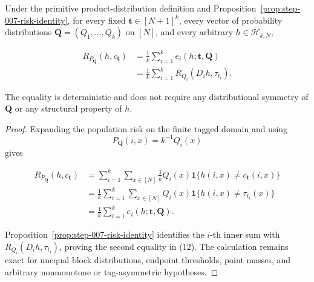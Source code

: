 \begin{proposition}\label{prop:step-008-risk-decomposition}
Under the primitive product-distribution definition and Proposition~\ref{prop:step-007-risk-identity}, for every fixed
\(\boldsymbol t\in[N+1]^k\), every vector of probability distributions
\(\boldsymbol Q=(Q_1,\ldots,Q_k)\) on \([N]\), and every arbitrary
\(h\in\mathcal H_{k,N}\),

\[
\begin{aligned}
R_{P_{\boldsymbol Q}}(h,c_{\boldsymbol t})
&=\frac1k\sum_{i=1}^k e_i(h;\boldsymbol t,\boldsymbol Q)\\
&=\frac1k\sum_{i=1}^k
  R_{Q_i}(D_i h,\tau_{t_i}).
\end{aligned}
\tag{12}
\]

The equality is deterministic and does not require any distributional
symmetry of \(\boldsymbol Q\) or any structural property of \(h\).
\end{proposition}

\begin{proof}
Expanding the population risk on the finite tagged domain and using
\[
P_{\boldsymbol Q}(i,x)=k^{-1}Q_i(x)
\]
gives

\[
\begin{aligned}
R_{P_{\boldsymbol Q}}(h,c_{\boldsymbol t})
&=\sum_{i=1}^k\sum_{x\in[N]}
  \frac1k Q_i(x)
  \mathbf1\{h(i,x)\ne c_{\boldsymbol t}(i,x)\}\\
&=\frac1k\sum_{i=1}^k\sum_{x\in[N]}Q_i(x)
  \mathbf1\{h(i,x)\ne\tau_{t_i}(x)\}\\
&=\frac1k\sum_{i=1}^k e_i(h;\boldsymbol t,\boldsymbol Q).
\end{aligned}
\tag{13}
\]

Proposition~\ref{prop:step-007-risk-identity} identifies the
\(i\)-th inner sum with
\(R_{Q_i}(D_i h,\tau_{t_i})\), proving the second equality in (12). The
calculation remains exact for unequal block distributions, endpoint
thresholds, point masses, and arbitrary nonmonotone or tag-asymmetric
hypotheses. \end{proof}

